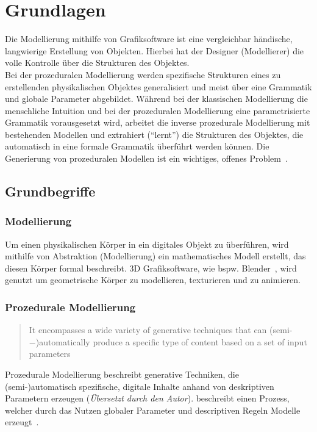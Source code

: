 
\chapter{Grundlagen}

Die Modellierung mithilfe von Grafiksoftware ist eine vergleichbar händische, langwierige Erstellung von
Objekten.
Hierbei hat der Designer (Modellierer) die volle Kontrolle über die Strukturen des Objektes.\\
Bei der prozeduralen Modellierung werden spezifische Strukturen eines zu erstellenden physikalischen Objektes
generalisiert und meist über eine Grammatik und globale Parameter abgebildet.
Während bei der klassischen Modellierung die menschliche Intuition und bei der prozeduralen Modellierung eine
parametrisierte Grammatik vorausgesetzt wird, arbeitet die inverse prozedurale Modellierung mit bestehenden Modellen und
extrahiert ("`lernt"') die Strukturen des Objektes, die automatisch in eine formale Grammatik überführt werden können.
Die Generierung von prozeduralen Modellen ist ein wichtiges, offenes Problem~\cite{benes_2011}.

\section{Grundbegriffe}

\subsection*{Modellierung}
Um einen physikalischen Körper in ein digitales Objekt zu überführen, wird mithilfe von Abstraktion (Modellierung)
ein mathematisches Modell erstellt, das diesen Körper formal beschreibt.
3D Grafiksoftware, wie bspw. Blender~\cite{blender}, wird genutzt um geometrische Körper zu modellieren, texturieren
und zu animieren.
\subsection*{Prozedurale Modellierung}
\begin{quote}
    It encompasses a wide variety of generative techniques that
    can (semi-−)automatically produce a specific type of content based on a set of input
    parameters~\cite{smelik_2014}
\end{quote}
Prozedurale Modellierung beschreibt generative Techniken, die \\(semi-)automatisch spezifische, digitale
Inhalte anhand von deskriptiven Parametern erzeugen (\textit{Übersetzt durch den Autor}).
\citeauthor{smelik_2014} beschreibt einen Prozess, welcher durch das Nutzen globaler Parameter und descriptiven Regeln
Modelle erzeugt~\cite{smelik_2014}.
